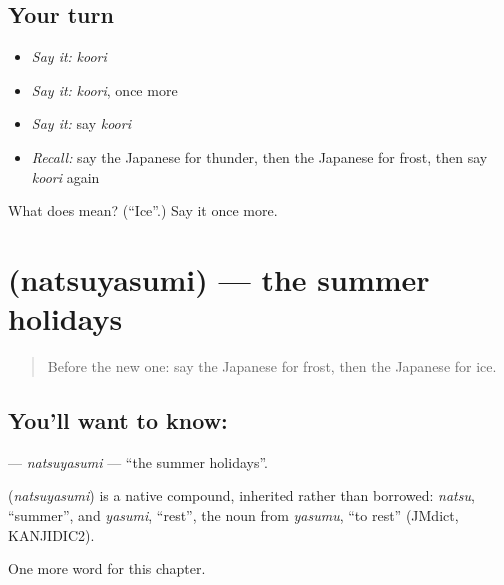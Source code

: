 \subsection*{Your turn}
\begin{itemize}
\raggedright
  \item \emph{Say it:} \emph{koori}
  \item \emph{Say it:} \emph{koori}, once more
  \item \emph{Say it:} say \emph{koori}
  \item \emph{Recall:} say the Japanese for thunder, then the Japanese for frost, then say \emph{koori} again
\end{itemize}

\begin{tcolorbox}[breakable,colback=teal!4,colframe=teal!35!black,title={Before you move on}]
What does  mean? (\textquotedblleft{}Ice\textquotedblright{}.) Say it once more.
\end{tcolorbox}
\section[\texorpdfstring{\ja{なつやすみ} (natsuyasumi)}{なつやすみ (natsuyasumi)}]{ (natsuyasumi) — the summer holidays}

\label{lesson:JA-C69-natsuyasumi}



\begin{quote}
Before the new one: say the Japanese for frost, then the Japanese for ice.
\end{quote}

\subsection*{You'll want to know: }
\textbf{} — \emph{natsuyasumi} — \textquotedblleft{}the summer holidays\textquotedblright{}.

\begin{cousinweb}
\textbf{} (\emph{natsuyasumi}) is a native compound, inherited rather than borrowed: \emph{natsu}, \textquotedblleft{}summer\textquotedblright{}, and \emph{yasumi}, \textquotedblleft{}rest\textquotedblright{}, the noun from \emph{yasumu}, \textquotedblleft{}to rest\textquotedblright{} (JMdict, KANJIDIC2).
\end{cousinweb}

\begin{grammarlens}[title={What you've built}]
One more word for this chapter.
\end{grammarlens}

